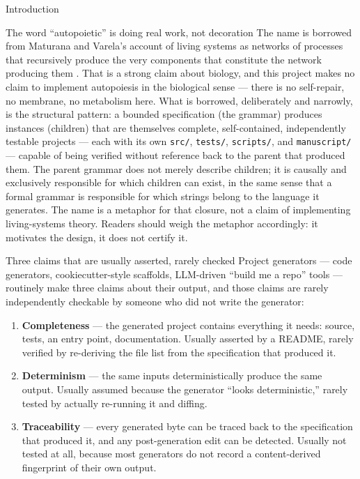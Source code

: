 \documentclass[
  ignorenonframetext,
]{beamer}
\providecommand{\tightlist}{%
  \setlength{\itemsep}{0pt}\setlength{\parskip}{0pt}}
\begin{document}
\begin{frame}{Introduction}
\begin{block}{The word ``autopoietic'' is doing real work, not
decoration}
\protect{}\label{the-word-autopoietic-is-doing-real-work-not-decoration}
The name is borrowed from Maturana and Varela's account of living
systems as networks of processes that recursively produce the very
components that constitute the network producing them
. That is a strong claim about biology, and
this project makes no claim to implement autopoiesis in the biological
sense --- there is no self-repair, no membrane, no metabolism here. What
is borrowed, deliberately and narrowly, is the structural pattern: a
bounded specification (the grammar) produces instances (children) that
are themselves complete, self-contained, independently testable projects
--- each with its own \texttt{src/}, \texttt{tests/}, \texttt{scripts/},
and \texttt{manuscript/} --- capable of being verified without reference
back to the parent that produced them. The parent grammar does not
merely describe children; it is causally and exclusively responsible for
which children can exist, in the same sense that a formal grammar is
responsible for which strings belong to the language it generates. The
name is a metaphor for that closure, not a claim of implementing
living-systems theory. Readers should weigh the metaphor accordingly: it
motivates the design, it does not certify it.
\end{block}

\begin{block}{Three claims that are usually asserted, rarely checked}
\protect{}\label{three-claims-that-are-usually-asserted-rarely-checked}
Project generators --- code generators, cookiecutter-style scaffolds,
LLM-driven ``build me a repo'' tools --- routinely make three claims
about their output, and those claims are rarely independently checkable
by someone who did not write the generator:

\begin{enumerate}
\tightlist
\item
  \textbf{Completeness} --- the generated project contains everything it
  needs: source, tests, an entry point, documentation. Usually asserted
  by a README, rarely verified by re-deriving the file list from the
  specification that produced it.
\item
  \textbf{Determinism} --- the same inputs deterministically produce the
  same output. Usually assumed because the generator ``looks
  deterministic,'' rarely tested by actually re-running it and diffing.
\item
  \textbf{Traceability} --- every generated byte can be traced back to
  the specification that produced it, and any post-generation edit can
  be detected. Usually not tested at all, because most generators do not
  record a content-derived fingerprint of their own output.
\end{enumerate}


\end{block}
\end{frame}
\end{document}
